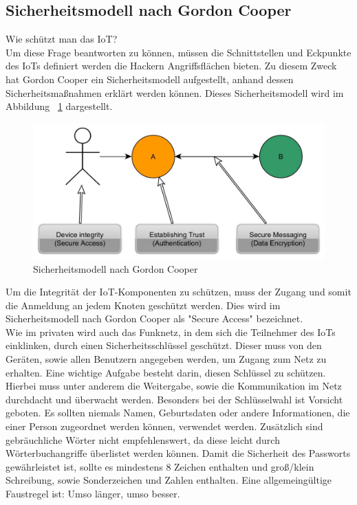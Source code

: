 \subsection{Sicherheitsmodell nach Gordon Cooper}\label{ss:Sicherheitsmodell}


Wie schützt man das \ac{IoT}?\\

Um diese Frage beantworten zu können, müssen die Schnittstellen und Eckpunkte des \ac{IoT}s definiert werden die Hackern Angriffsflächen bieten. Zu diesem Zweck hat Gordon Cooper ein Sicherheitsmodell aufgestellt, anhand dessen Sicherheitsmaßnahmen erklärt werden können. Dieses Sicherheitsmodell wird im Abbildung ~\ref{f:security} dargestellt.

\vspace{5 mm}
\begin{figure}[H] 
	\centering
	\includegraphics[scale=0.4]{Bilder/sicherheitsmodell}
	\caption{Sicherheitsmodell nach Gordon Cooper\cite{z:DesignElektronik}}
	\label{f:security}
\end{figure}
\vspace{5 mm}

Um die Integrität der \ac{IoT}-Komponenten zu schützen, muss der Zugang und somit die Anmeldung an jedem Knoten geschützt werden. Dies wird im Sicherheitsmodell nach Gordon Cooper als "Secure Access" bezeichnet.\\
Wie im privaten wird auch das Funknetz, in dem sich die Teilnehmer des \ac{IoT}s einklinken, durch einen Sicherheitsschlüssel geschützt. Dieser muss von den Geräten, sowie allen Benutzern angegeben werden, um Zugang zum Netz zu erhalten. Eine wichtige Aufgabe besteht darin, diesen Schlüssel zu schützen. Hierbei muss unter anderem die Weitergabe, sowie die Kommunikation im Netz durchdacht und überwacht werden. Besonders bei der Schlüsselwahl ist Vorsicht geboten. Es sollten niemals Namen, Geburtsdaten oder andere Informationen, die einer Person zugeordnet werden können, verwendet werden. Zusätzlich sind gebräuchliche Wörter nicht empfehlenswert, da diese leicht durch Wörterbuchangriffe überlistet werden können. Damit die Sicherheit des Passworts gewährleistet ist, sollte es mindestens 8 Zeichen enthalten und groß/klein Schreibung, sowie Sonderzeichen und Zahlen enthalten. Eine allgemeingültige Faustregel ist: Umso länger, umso besser.\\

